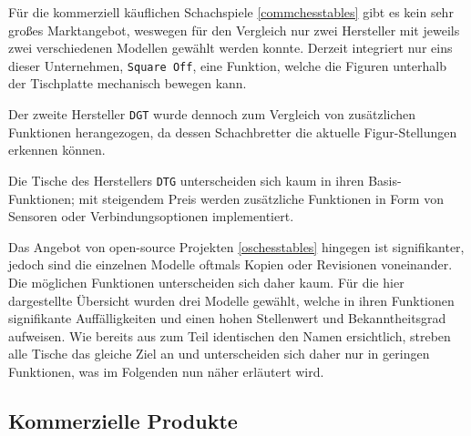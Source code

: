 Für die kommerziell käuflichen Schachspiele \ref{commchesstables} gibt
es kein sehr großes Marktangebot, weswegen für den Vergleich nur zwei
Hersteller mit jeweils zwei verschiedenen Modellen gewählt werden
konnte. Derzeit integriert nur eins dieser Unternehmen,
\passthrough{\lstinline!Square Off!}, eine Funktion, welche die Figuren
unterhalb der Tischplatte mechanisch bewegen kann.

Der zweite Hersteller \passthrough{\lstinline!DGT!} wurde dennoch zum
Vergleich von zusätzlichen Funktionen herangezogen, da dessen
Schachbretter die aktuelle Figur-Stellungen erkennen können.

Die Tische des Herstellers \passthrough{\lstinline!DTG!} unterscheiden
sich kaum in ihren Basis-Funktionen; mit steigendem Preis werden
zusätzliche Funktionen in Form von Sensoren oder Verbindungsoptionen
implementiert.

Das Angebot von open-source Projekten \ref{oschesstables} hingegen ist
signifikanter, jedoch sind die einzelnen Modelle oftmals Kopien oder
Revisionen voneinander. Die möglichen Funktionen unterscheiden sich
daher kaum. Für die hier dargestellte Übersicht wurden drei Modelle
gewählt, welche in ihren Funktionen signifikante Auffälligkeiten und
einen hohen Stellenwert und Bekanntheitsgrad aufweisen. Wie bereits aus
zum Teil identischen den Namen ersichtlich, streben alle Tische das
gleiche Ziel an und unterscheiden sich daher nur in geringen Funktionen,
was im Folgenden nun näher erläutert wird.

\hypertarget{kommerzielle-produkte}{%
\subsection{Kommerzielle Produkte}\label{kommerzielle-produkte}}

